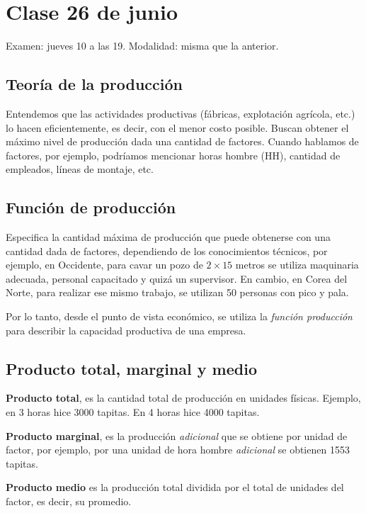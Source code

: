 \section{Clase 26 de junio}

Examen: jueves 10 a las 19.
Modalidad: misma que la anterior.

\subsection{Teoría de la producción}

Entendemos que las actividades productivas 
(fábricas, explotación agrícola, etc.) 
lo hacen eficientemente, es decir,
con el menor costo posible.
Buscan obtener el máximo nivel de producción dada una cantidad de factores.
Cuando hablamos de factores, por ejemplo,
podríamos mencionar horas hombre (HH), 
cantidad de empleados,
líneas de montaje, etc.

\subsection{Función de producción}

Especifica la cantidad máxima de producción que puede obtenerse con una cantidad
dada de factores,
dependiendo de los conocimientos técnicos,
por ejemplo,
en Occidente,
para cavar un pozo de \(2\times15\) metros se utiliza maquinaria adecuada,
personal capacitado y quizá un supervisor.
En cambio,
en Corea del Norte,
para realizar ese mismo trabajo,
se utilizan 50 personas con pico y pala.

Por lo tanto,
desde el punto de vista económico,
se utiliza la \textit{función producción} para describir la capacidad productiva
de una empresa.

\subsection{Producto total, marginal y medio}

\textbf{Producto total}, 
es la cantidad total de producción en unidades físicas.
Ejemplo, en 3 horas hice 3000 tapitas. En 4 horas hice 4000 tapitas.

\textbf{Producto marginal},
es la producción \textit{adicional} que se obtiene por unidad de factor,
por ejemplo,
por una unidad de hora hombre \textit{adicional} se obtienen 1553 tapitas.

\textbf{Producto medio} 
es la producción total dividida por el total de unidades del factor,
es decir,
su promedio.

